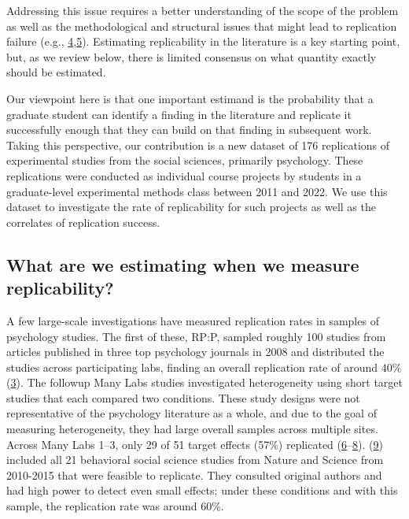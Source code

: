 \documentclass[
  english,
  a4paper,
]{article}
\begin{document}
Addressing this issue requires a better understanding of the scope of the problem as well as the methodological and structural issues that might lead to replication failure (e.g., \protect\hyperlink{ref-smaldino2016}{4},\protect\hyperlink{ref-simmons2011}{5}). Estimating replicability in the literature is a key starting point, but, as we review below, there is limited consensus on what quantity exactly should be estimated.

Our viewpoint here is that one important estimand is the probability that a graduate student can identify a finding in the literature and replicate it successfully enough that they can build on that finding in subsequent work. Taking this perspective, our contribution is a new dataset of 176 replications of experimental studies from the social sciences, primarily psychology. These replications were conducted as individual course projects by students in a graduate-level experimental methods class between 2011 and 2022. We use this dataset to investigate the rate of replicability for such projects as well as the correlates of replication success.

\hypertarget{what-are-we-estimating-when-we-measure-replicability}{%
\subsection{What are we estimating when we measure replicability?}\label{what-are-we-estimating-when-we-measure-replicability}}

A few large-scale investigations have measured replication rates in samples of psychology studies. The first of these, RP:P, sampled roughly 100 studies from articles published in three top psychology journals in 2008 and distributed the studies across participating labs, finding an overall replication rate of around 40\% (\protect\hyperlink{ref-openscienceconsortium2015}{3}). The followup Many Labs studies investigated heterogeneity using short target studies that each compared two conditions. These study designs were not representative of the psychology literature as a whole, and due to the goal of measuring heterogeneity, they had large overall samples across multiple sites. Across Many Labs 1--3, only 29 of 51 target effects (57\%) replicated (\protect\hyperlink{ref-klein2014}{6}--\protect\hyperlink{ref-ebersole2016}{8}). (\protect\hyperlink{ref-camerer2018}{9}) included all 21 behavioral social science studies from Nature and Science from 2010-2015 that were feasible to replicate. They consulted original authors and had high power to detect even small effects; under these conditions and with this sample, the replication rate was around 60\%.
\end{document}
